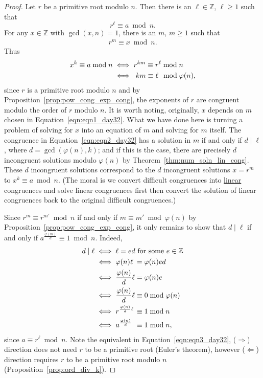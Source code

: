 \documentclass{amsbook}
\theoremstyle{plain}
\theoremstyle{definition}
\theoremstyle{remark}
\numberwithin{equation}{chapter}
\numberwithin{figure}{chapter}
\newcommand{\Z}{\mathbb{Z}}
\begin{document}
\begin{proof}
  Let $r$ be a primitive root modulo $n$. Then there is an $\ell \in \Z$, $\ell \geqslant 1$ such that
  \[
    r^\ell \equiv a \bmod n.
  \]
  For any $x \in \Z$ with $\gcd (x, n) = 1$, there is an $m$, $m \geqslant 1$ such that
  \begin{align} \label{eqn:eqn1_day32}
    r^m \equiv x \bmod n.
  \end{align}
  Thus
  \begin{align}
    x^k \equiv a \bmod n & \iff r^{km} \equiv r^\ell \bmod n \\
                         & \iff \hspace{1mm} km \equiv \ell \hspace{1.5mm}\bmod \varphi (n), \label{eqn:eqn2_day32}
  \end{align}
  since $r$ is a primitive root modulo $n$ and by Proposition~\ref{prop:pow_cong_exp_cong}, the exponents of $r$ are congruent modulo the order of $r$ modulo $n$. It is worth noting, originally, $x$ depends on $m$ chosen in Equation~\eqref{eqn:eqn1_day32}. What we have done here is turning a problem of solving for $x$ into an equation of $m$ and solving for $m$ itself. The congruence in Equation~\eqref{eqn:eqn2_day32} has a solution in $m$ if and only if $d \mid \ell$, where $d = \gcd (\varphi (n), k)$; and if this is the case, there are precisely $d$ incongruent solutions modulo $\varphi (n)$ by Theorem~\ref{thm:num_soln_lin_cong}. These $d$ incongruent solutions correspond to the $d$ incongruent solutions $x = r^m $ to $x^k \equiv a \bmod n$. (The moral is we convert difficult congruences into \underline{linear} congruences and solve linear congruences first then convert the solution of linear congruences back to the original difficult congruences.)

  Since $r^m \equiv r^{m'} \bmod n$ if and only if $m \equiv m' \bmod \varphi (n)$ by Proposition~\ref{prop:pow_cong_exp_cong}, it only remains to show that $d \mid \ell$ if and only if $a^{\frac{\varphi (m)}d} \equiv 1 \bmod n$. Indeed,
  \begin{align}
    d \mid \ell &\iff \ell = ed \text{ for some $e \in \Z$} \\
                &\iff \varphi (n) \ell \hspace{.8mm}= \varphi (n) ed \\
                &\iff \frac{\varphi (n)}d \ell = \varphi (n) e \\
                &\iff \frac{\varphi (n)}d \ell \equiv 0 \bmod \varphi (n) \\
\label{eqn:eqn3_day32}                &\iff r^{\frac{\varphi (n)}d \ell} \hspace{0.5mm} \equiv 1 \bmod n \\
                &\iff a^{\frac{\varphi (n)}d} \hspace{1.5mm}\equiv 1 \bmod n,
  \end{align}
  since $a \equiv r^\ell \bmod n$. Note the equivalent in Equation~\eqref{eqn:eqn3_day32}, ($\Rightarrow$) direction does not need $r$ to be a primitive root (Euler's theorem), however ($\Leftarrow$) direction requires $r$ to be a primitive root modulo $n$ (Proposition~\ref{prop:ord_div_k}).
\end{proof}
\end{document}
